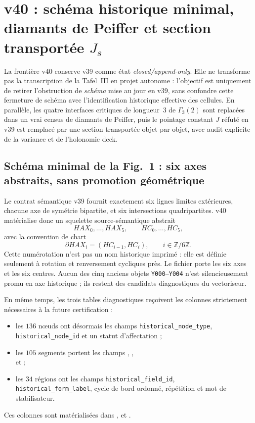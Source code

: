 \documentclass[11pt,a4paper]{article}
\begin{document}
\section{v40 : schéma historique minimal, diamants de Peiffer et section transportée $J_s$}\label{sec:v40-schema-peiffer-J}

La frontière v40 conserve v39 comme état \emph{closed/append-only}. Elle ne transforme pas la transcription de la Tafel~III en projet autonome : l'objectif est uniquement de retirer l'obstruction de \emph{schéma} mise au jour en v39, sans confondre cette fermeture de schéma avec l'identification historique effective des cellules. En parallèle, les quatre interfaces critiques de longueur~$3$ de $\Gamma_3(2)$ sont replacées dans un vrai census de diamants de Peiffer, puis le pointage constant $J$ réfuté en v39 est remplacé par une section transportée objet par objet, avec audit explicite de la variance et de l'holonomie deck.

\subsection{Schéma minimal de la Fig.~1 : six axes abstraits, sans promotion géométrique}

Le contrat sémantique v39 fournit exactement six lignes limites extérieures, chacune axe de symétrie bipartite, et six intersections quadripartites. v40 matérialise donc un squelette source-sémantique abstrait
\[
  HAX_0,\ldots,HAX_5,
  \qquad
  HC_0,\ldots,HC_5,
\]
avec la convention de chart
\[
 \partial HAX_i=(HC_{i-1},HC_i),
 \qquad i\in\mathbb Z/6\mathbb Z.
\]
Cette numérotation n'est pas un nom historique imprimé : elle est définie seulement à rotation et renversement cycliques près. Le fichier  porte les six axes et  les six centres. Aucun des cinq anciens objets \texttt{Y000--Y004} n'est silencieusement promu en axe historique ; ils restent des candidats diagnostiques du vectoriseur.

En même temps, les trois tables diagnostiques reçoivent les colonnes strictement nécessaires à la future certification :
\begin{itemize}
\item les $136$ nœuds ont désormais les champs \texttt{historical\_node\_type}, \texttt{historical\_node\_id} et un statut d'affectation ;
\item les $105$ segments portent les champs , ,\\ et  ;
\item les $34$ régions ont les champs \texttt{historical\_field\_id}, \texttt{historical\_form\_label}, cycle de bord ordonné, répétition et mot de stabilisateur.
\end{itemize}
Ces colonnes sont matérialisées dans ,  et .
\end{document}
